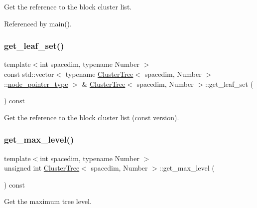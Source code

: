 Get the reference to the block cluster list. 

Referenced by main().

\mbox{\label{classClusterTree_afbf8f03d5f34305d3c34ae4c360f50ae}} 
\subsubsection{\texorpdfstring{get\+\_\+leaf\+\_\+set()}{get\_leaf\_set()}\hspace{0.1cm}{\footnotesize\ttfamily [2/2]}}
{\footnotesize\ttfamily template$<$int spacedim, typename Number $>$ \\
const std\+::vector$<$ typename \hyperlink{classClusterTree}{Cluster\+Tree}$<$ spacedim, Number $>$\+::\hyperlink{classClusterTree_ae4bb0fdc7ac559d7844d04a00ab3e9de}{node\+\_\+pointer\+\_\+type} $>$ \& \hyperlink{classClusterTree}{Cluster\+Tree}$<$ spacedim, Number $>$\+::get\+\_\+leaf\+\_\+set (\begin{DoxyParamCaption}{ }\end{DoxyParamCaption}) const}

Get the reference to the block cluster list (const version). \mbox{\label{classClusterTree_a3c1125039b1915ebad94247d6888df31}} 
\subsubsection{\texorpdfstring{get\+\_\+max\+\_\+level()}{get\_max\_level()}}
{\footnotesize\ttfamily template$<$int spacedim, typename Number $>$ \\
unsigned int \hyperlink{classClusterTree}{Cluster\+Tree}$<$ spacedim, Number $>$\+::get\+\_\+max\+\_\+level (\begin{DoxyParamCaption}{ }\end{DoxyParamCaption}) const}

Get the maximum tree level. \mbox{\label{classClusterTree_a403e59575a89a3e86e8d7092a8815aa5}} 
